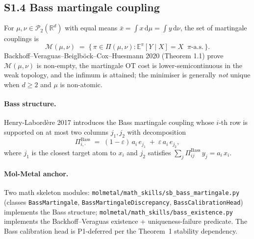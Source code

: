 \subsection*{S1.4 Bass martingale coupling}
\label{supp:s1-bass}

For $\mu, \nu \in \mathcal{P}_{2}(\mathbb{R}^{d})$ with equal means
$\bar{x} = \int x \,\mathrm{d}\mu = \int y \,\mathrm{d}\nu$, the set
of martingale couplings is
\begin{equation}
  \label{eq:martingale-coupling}
  \mathcal{M}(\mu, \nu) \;=\; \bigl\{\, \pi \in \Pi(\mu, \nu) :
        \mathbb{E}^{\pi}[Y \mid X] = X \;\; \pi\text{-a.s.} \,\bigr\}.
\end{equation}
Backhoff--Veraguas--Beiglb\"ock--Cox--Huesmann 2020
\cite{backhoff_veraguas2020bass_existence} (Theorem 1.1) prove
$\mathcal{M}(\mu, \nu)$ is non-empty, the martingale OT cost is
lower-semicontinuous in the weak topology, and the infimum is
attained; the minimiser is generally \emph{not} unique when $d \ge
2$ and $\mu$ is non-atomic.

\paragraph{Bass structure.}
Henry-Labord\`ere 2017 \cite{henry_labordere2017bass} introduces
the Bass martingale coupling whose $i$-th row is supported on at
most two columns $j_{1}, j_{2}$ with decomposition
\begin{equation}
  \label{eq:bass-row}
  \Pi^{\mathrm{Bass}}_{i, \cdot} \;=\;
        (1 - \varepsilon)\, a_{i}\, e_{j_{1}}
        \;+\; \varepsilon\, a_{i}\, e_{j_{2}},
\end{equation}
where $j_{1}$ is the closest target atom to $x_{i}$ and $j_{2}$
satisfies $\sum_{j} \Pi^{\mathrm{Bass}}_{ij}\, y_{j} = a_{i}\,
x_{i}$.

\paragraph{Mol-Metal anchor.}
Two math skeleton modules:
\texttt{molmetal/math\_skills/sb\_bass\_martingale.py} (classes
\texttt{BassMartingale}, \texttt{BassMartingaleDiscrepancy},
\texttt{BassCalibrationHead}) implements the Bass structure;
\texttt{molmetal/math\_skills/bass\_existence.py} implements the
Backhoff--Veraguas existence + uniqueness-failure predicate.  The
Bass calibration head is P1-deferred per the Theorem~1 stability
dependency.

